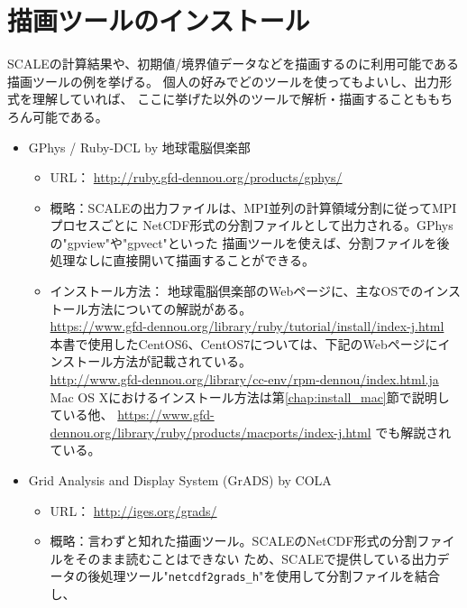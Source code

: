\section{描画ツールのインストール} \label{chap:install_drawtool}
\label{sec:env_vis_tools}

SCALEの計算結果や、初期値/境界値データなどを描画するのに利用可能である描画ツールの例を挙げる。
個人の好みでどのツールを使ってもよいし、出力形式を理解していれば、
ここに挙げた以外のツールで解析・描画することももちろん可能である。

\begin{itemize}
\item GPhys / Ruby-DCL by 地球電脳倶楽部\\
 \begin{itemize}
  \item URL： \url{http://ruby.gfd-dennou.org/products/gphys/}
  \item 概略：SCALEの出力ファイルは、MPI並列の計算領域分割に従ってMPIプロセスごとに
              NetCDF形式の分割ファイルとして出力される。GPhysの"gpview"や"gpvect"といった
              描画ツールを使えば、分割ファイルを後処理なしに直接開いて描画することができる。
  \item インストール方法：
  地球電脳倶楽部のWebページに、主なOSでのインストール方法についての解説がある。\\
  \url{https://www.gfd-dennou.org/library/ruby/tutorial/install/index-j.html}\\
  本書で使用したCentOS6、CentOS7については、下記のWebページにインストール方法が記載されている。\\
  \url{http://www.gfd-dennou.org/library/cc-env/rpm-dennou/index.html.ja}\\
   Mac OS Xにおけるインストール方法は第\ref{chap:install_mac}節で説明している他、
   \url{https://www.gfd-dennou.org/library/ruby/products/macports/index-j.html}
   でも解説されている。
   \end{itemize}
\item Grid Analysis and Display System (GrADS) by COLA\\
 \begin{itemize}
  \item URL： \url{http://iges.org/grads/}
  \item 概略：言わずと知れた描画ツール。SCALEのNetCDF形式の分割ファイルをそのまま読むことはできない
             ため、SCALEで提供している出力データの後処理ツール"\verb|netcdf2grads_h|"を使用して分割ファイルを結合し、

\end{itemize}
\end{itemize}
